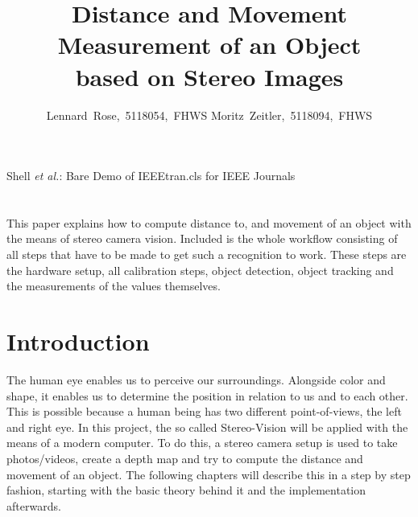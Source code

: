 \documentclass[journal,onecolumn]{IEEEtran}
\makeatletter
\renewenvironment{abstract}{%
    \if@twocolumn
      \section*{\abstractname}%
    \else %
      \begin{center}%
        {\bfseries \Large\abstractname\vspace{\z@}}%
      \end{center}%
      \quotation
    \fi}
    {\if@twocolumn\else\endquotation\fi}
\makeatother
\begin{document}
	\title{Distance and Movement Measurement of an Object\\ based on Stereo Images}

	\author{Lennard~Rose,~5118054,~FHWS
		Moritz~Zeitler,~5118094,~FHWS%
	}
	{Shell \MakeLowercase{\textit{et al.}}: Bare Demo of IEEEtran.cls for IEEE Journals}

	\maketitle

	\begin{abstract}
   		\normalsize
		\noindent
		This paper explains how to compute distance to, and movement of an object with the means of stereo camera vision.
		Included is the whole workflow consisting of all steps that have to be made to get such a recognition to work. These steps are the hardware setup, all calibration steps, object detection, object tracking and the measurements of the values themselves.
	\end{abstract}


	\IEEEpeerreviewmaketitle

	\section{Introduction}
\label{sec:einfuehrung}
\noindent
The human eye enables us to perceive our surroundings. Alongside color and shape, it enables us to determine the position in relation to us and to each other. This is possible because a human being has two different point-of-views, the left and right eye. In this project, the so called Stereo-Vision will be applied with the means of a modern computer. To do this, a stereo camera setup is used to take photos/videos, create a depth map and try to compute the distance and movement of an object. The following chapters will describe this in a step by step fashion, starting with the basic theory behind it and the implementation afterwards.
\end{document}
